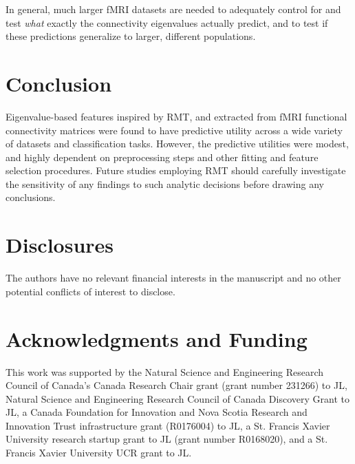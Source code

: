 \documentclass[12pt]{spieman}  %
\begin{document}
\begin{spacing}{2}
In general, much larger fMRI datasets are needed to adequately control for and test
\textit{what} exactly the connectivity eigenvalues actually predict, and to test
if these predictions generalize to larger, different populations.



\section{Conclusion}

Eigenvalue-based features inspired by RMT, and extracted from fMRI functional
connectivity matrices were found to have predictive utility across a wide
variety of datasets and classification tasks. However, the predictive utilities
were modest, and highly dependent on preprocessing steps and other fitting and
feature selection procedures. Future studies employing RMT should carefully
investigate the sensitivity of any findings to such analytic decisions before
drawing any conclusions.


\section{Disclosures}
The authors have no relevant financial interests in the manuscript and no other
potential conflicts of interest to disclose.


\section*{Acknowledgments and Funding}
This work was supported by the Natural Science and Engineering Research
Council of Canada's Canada Research Chair grant (grant number 231266) to JL,
Natural Science and Engineering Research Council of Canada Discovery Grant to
JL, a Canada Foundation for Innovation and Nova Scotia Research and Innovation
Trust infrastructure grant (R0176004) to JL, a St. Francis Xavier University
research startup grant to JL (grant number R0168020), and a St. Francis Xavier
University UCR grant to JL.


\end{spacing}
\end{document}

